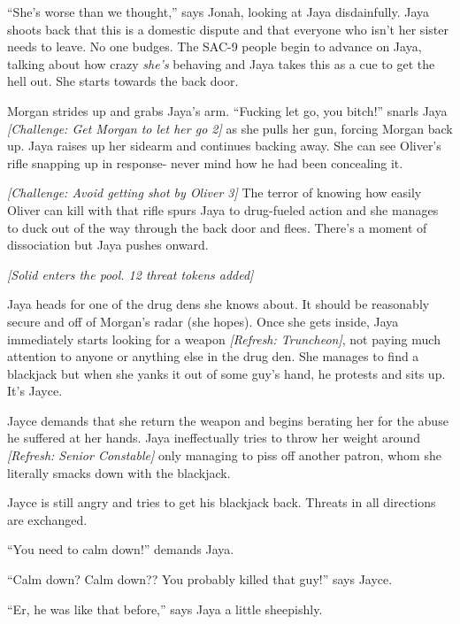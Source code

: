 ``She's worse than we thought,'' says Jonah, looking at Jaya disdainfully.  Jaya shoots back that this is a domestic dispute and that everyone who isn't her sister needs to leave.   No one budges.  The SAC-9 people begin to advance on Jaya, talking about how crazy \textit{she's} behaving and Jaya takes this as a cue to get the hell out.  She starts towards the back door. 



Morgan strides up and grabs Jaya's arm.  ``Fucking let go, you bitch!'' snarls Jaya \textit{{[}Challenge: Get Morgan to let her go 2{]}} as she pulls her gun, forcing Morgan back up.  Jaya raises up her sidearm and continues backing away.  She can see Oliver's rifle snapping up in response- never mind how he had been concealing it.  



\textit{{[}Challenge: Avoid getting shot by Oliver 3{]}} The terror of knowing how easily Oliver can kill with that rifle spurs Jaya to drug-fueled action and she manages to duck out of the way through the back door and flees.  There's a moment of dissociation but Jaya pushes onward.



\textit{{[}Solid enters the pool.  12 threat tokens added{]}}



Jaya heads for one of the drug dens she knows about.  It should be reasonably secure and off of Morgan's radar (she hopes).  Once she gets inside, Jaya immediately starts looking for a weapon \textit{{[}Refresh: Truncheon{]}}, not paying much attention to anyone or anything else in the drug den.  She manages to find a blackjack but when she yanks it out of some guy's hand, he protests and sits up.  It's Jayce.



Jayce demands that she return the weapon and begins berating her for the abuse he suffered at her hands.  Jaya ineffectually tries to throw her weight around \textit{{[}Refresh: Senior Constable{]} }only managing to piss off another patron, whom she literally smacks down with the blackjack.



Jayce is still angry and tries to get his blackjack back.  Threats in all directions are exchanged.

``You need to calm down!'' demands Jaya.  

``Calm down?  Calm down??  You probably killed that guy!'' says Jayce.

``Er, he was like that before,'' says Jaya a little sheepishly.

